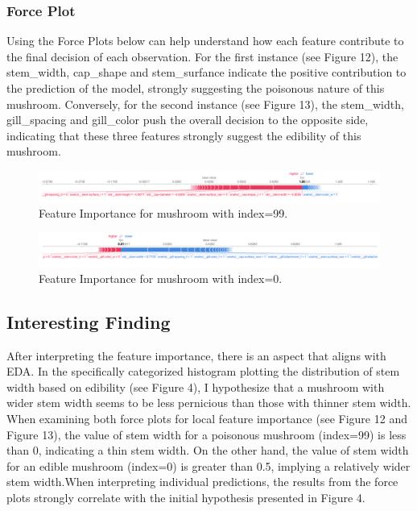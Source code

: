\documentclass{article}
\begin{document}
\subsubsection{Force Plot}
\hspace{0.5cm} Using the Force Plots below can help understand how each feature contribute to the final decision of each observation. For the first instance (see Figure 12), the stem\_width, cap\_shape and stem\_surfance indicate the positive contribution to the prediction of the model, strongly suggesting the poisonous nature of this mushroom. Conversely, for the second instance (see Figure 13), the stem\_width, gill\_spacing and gill\_color push the overall decision to the opposite side, indicating that these three features strongly suggest the edibility of this mushroom.

\begin{figure}[h]
\centering
\includegraphics[width=1\textwidth]{local_shp_knn_index=99.png}
\caption{\label{fig:frog} Feature Importance for mushroom with index=99.}
\end{figure}

\begin{figure}[h]
\centering
\includegraphics[width=1\textwidth]{local_shap_knn_index=0.png}
\caption{\label{fig:frog} Feature Importance for mushroom with index=0.}
\end{figure}

\subsection{Interesting Finding}
\hspace{0.5cm} After interpreting the feature importance, there is an aspect that aligns with EDA. In the specifically categorized histogram plotting the distribution of stem width based on edibility (see Figure 4), I hypothesize that a mushroom with wider stem width seems to be less pernicious than those with thinner stem width. When examining both force plots for local feature importance (see Figure 12 and Figure 13), the value of stem width for a poisonous mushroom (index=99) is less than 0, indicating a thin stem width. On the other hand, the value of stem width for an edible mushroom (index=0) is greater than 0.5, implying a relatively wider stem width.When interpreting individual predictions, the results from the force plots strongly correlate with the initial hypothesis presented in Figure 4.
\end{document}
